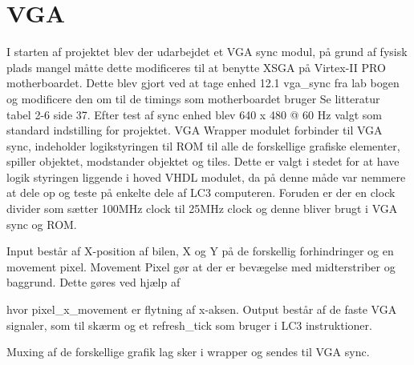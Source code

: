 \section{VGA}
I starten af projektet blev der udarbejdet et VGA sync modul, på grund af fysisk plads mangel måtte dette modificeres til at benytte XSGA på Virtex-II PRO motherboardet. Dette blev gjort ved at tage enhed 12.1 vga\_sync fra lab bogen~\cite{chu} og modificere den om til de timings som motherboardet bruger Se litteratur~\cite{hardwaremanual} tabel 2-6 side 37.
Efter test af sync enhed blev 640 x 480 @ 60 Hz valgt som standard indstilling for projektet.
VGA Wrapper modulet forbinder til VGA sync, indeholder logikstyringen til ROM til alle de forskellige grafiske elementer, spiller objektet, modstander objektet og tiles. Dette er valgt i stedet for at have logik styringen liggende i hoved VHDL modulet, da på denne måde var nemmere at dele op og teste på enkelte dele af LC3 computeren. Foruden er der en clock divider som sætter 100MHz clock til 25MHz clock og denne bliver brugt i VGA sync og ROM. 

Input består af X-position af bilen, X og Y på de forskellig forhindringer og en movement pixel. Movement Pixel gør at der er bevægelse med midterstriber og baggrund.
Dette gøres ved hjælp af 

hvor pixel\_x\_movement er flytning af x-aksen.
Output består af de faste VGA signaler, som til skærm og et refresh\_tick som bruger i LC3 instruktioner. 

Muxing af de forskellige grafik lag sker i wrapper og sendes til VGA sync.